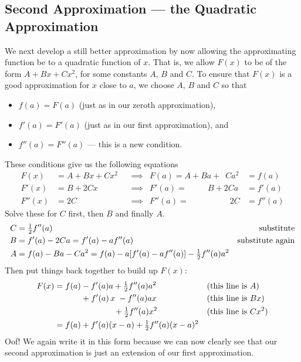 \subsection{Second Approximation --- the Quadratic Approximation}
\label{ssec_second_approx}

We next develop a still better approximation by now allowing the
approximating function be to a quadratic function of $x$. That is,
we allow $F(x)$ to be of the form $A+Bx+Cx^2$, for some constants $A$, $B$
and $C$. To ensure that $F(x)$ is a good approximation for $x$ close
to $a$, we choose $A$, $B$ and $C$ so that
\begin{itemize}
  \item $f(a)=F(a)$  (just as in our zeroth approximation),
  \item $f'(a)=F'(a)$ (just as in our first approximation), and
  \item $f''(a)=F''(a)$ --- this is a new condition.
\end{itemize}
These conditions give us the following equations
\begin{align*}
F(x)&=A+Bx+Cx^2  & &\implies & F(a)=A+Ba+\phantom{2}Ca^2&=f(a)\\
F'(x)&=B+2Cx & &\implies & F'(a)=\phantom{A+a}B+2Ca&=f'(a)\\
F''(x)&=2C   & &\implies & F''(a)=\phantom{A+aB+a}2C&=f''(a)
\end{align*}
Solve these for $C$ first, then $B$ and finally $A$.
\begin{align*}
C &=\tfrac{1}{2} f''(a) & \text{substitute}\\
B &= f'(a) - 2Ca = f'(a)-af''(a) & \text{substitute again}\\
A &= f(a)-Ba-Ca^2 = f(a)-a[f'(a)-af''(a)]-\tfrac{1}{2} f''(a)a^2
\end{align*}
Then put things back together to build up $F(x)$:
\begin{align*}
F(x)&=f(a)-f'(a)a+\tfrac{1}{2} f''(a)a^2 & &\text{(this line is $A$)}\cr
&\phantom{=f(a)\hskip3pt}+f'(a)\,x\hskip3pt- f''(a)ax
   & & \text{(this line is $Bx$)}\\
&\phantom{=f(a)-f'(a)a\hskip3.5pt}+\tfrac{1}{2} f''(a)x^2
 & &\text{(this line is $Cx^2$)}\\
&=f(a)+f'(a)(x-a)+\tfrac{1}{2} f''(a)(x-a)^2
\end{align*}
Oof! We again write it in this form because we can now clearly see that our second
approximation is just an extension of our first approximation.

